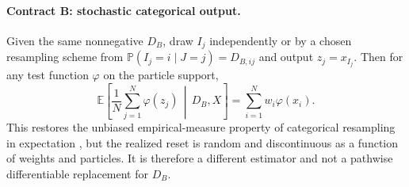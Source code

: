 \paragraph{Contract B: stochastic categorical output.}
Given the same nonnegative \(D_B\), draw \(I_j\) independently or by a chosen
resampling scheme from
\(\mathbb P(I_j=i\mid J=j)=D_{B,ij}\) and output \(z_j=x_{I_j}\).  Then for any
test function \(\varphi\) on the particle support,
\begin{equation}
\label{eq:bf-eot-stochastic-unbiased-test}
  \mathbb E\!\left[
    \frac1N\sum_{j=1}^N\varphi(z_j)\,\middle|\,D_B,X
  \right]
  =
  \sum_{i=1}^N w_i\varphi(x_i).
\end{equation}
This restores the unbiased empirical-measure property of categorical resampling
in expectation
\citep{gordon1993novel,doucet2001sequential,chopin2020introduction}, but the
realized reset is random and discontinuous as a function of weights and particles.
It is therefore a different estimator and not a pathwise differentiable
replacement for \(D_B\).

